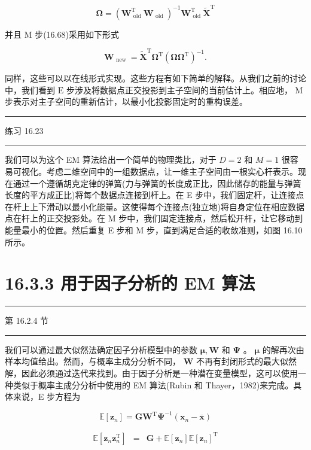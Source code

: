 \documentclass[10pt]{report}
\newcommand{\HRule}{\begin{center}\rule{0.9\linewidth}{0.2mm}\end{center}}
\begin{document}
\[
\mathbf{\Omega } = {\left( {\mathbf{W}}_{\text{ old }}^{\mathrm{T}}{\mathbf{W}}_{\text{ old }}\right) }^{-1}{\mathbf{W}}_{\text{ old }}^{\mathrm{T}}{\widetilde{\mathbf{X}}}^{\mathrm{T}} \tag{16.70}
\]

并且 M 步(16.68)采用如下形式

\[
{\mathbf{W}}_{\text{ new }} = {\widetilde{\mathbf{X}}}^{\mathrm{T}}{\mathbf{\Omega }}^{\mathrm{T}}{\left( \mathbf{\Omega }{\mathbf{\Omega }}^{\mathrm{T}}\right) }^{-1}. \tag{16.71}
\]

同样，这些可以以在线形式实现。这些方程有如下简单的解释。从我们之前的讨论中，我们看到 \(\mathrm{E}\) 步涉及将数据点正交投影到主子空间的当前估计上。相应地， \(\mathrm{M}\) 步表示对主子空间的重新估计，以最小化投影固定时的重构误差。

\HRule

练习 16.23

\HRule

我们可以为这个 EM 算法给出一个简单的物理类比，对于 \(D = 2\) 和 \(M = 1\) 很容易可视化。考虑二维空间中的一组数据点，让一维主子空间由一根实心杆表示。现在通过一个遵循胡克定律的弹簧(力与弹簧的长度成正比，因此储存的能量与弹簧长度的平方成正比)将每个数据点连接到杆上。在 E 步中，我们固定杆，让连接点在杆上上下滑动以最小化能量。这使得每个连接点(独立地)将自身定位在相应数据点在杆上的正交投影处。在 M 步中，我们固定连接点，然后松开杆，让它移动到能量最小的位置。然后重复 E 步和 M 步，直到满足合适的收敛准则，如图 16.10 所示。

\section*{16.3.3 用于因子分析的 EM 算法}

\HRule

第 16.2.4 节

\HRule

我们可以通过最大似然法确定因子分析模型中的参数 \(\mathbf{\mu },\mathbf{W}\) 和 \(\mathbf{\Psi }\) 。 \(\mathbf{\mu }\) 的解再次由样本均值给出。然而，与概率主成分分析不同， \(\mathbf{W}\) 不再有封闭形式的最大似然解，因此必须通过迭代来找到。由于因子分析是一种潜在变量模型，这可以使用一种类似于概率主成分分析中使用的 EM 算法(Rubin 和 Thayer，1982)来完成。具体来说，E 步方程为

\[
\mathbb{E}\left\lbrack  {\mathbf{z}}_{n}\right\rbrack   = {\mathbf{{GW}}}^{\mathrm{T}}{\mathbf{\Psi }}^{-1}\left( {{\mathbf{x}}_{n} - \overline{\mathbf{x}}}\right)  \tag{16.72}
\]

\[
\begin{matrix} \mathbb{E}\left\lbrack  {{\mathbf{z}}_{n}{\mathbf{z}}_{n}^{\mathrm{T}}}\right\rbrack  &  = & \mathbf{G} + \mathbb{E}\left\lbrack  {\mathbf{z}}_{n}\right\rbrack  \mathbb{E}{\left\lbrack  {\mathbf{z}}_{n}\right\rbrack  }^{\mathrm{T}} \end{matrix} \tag{16.73}
\]
\end{document}
